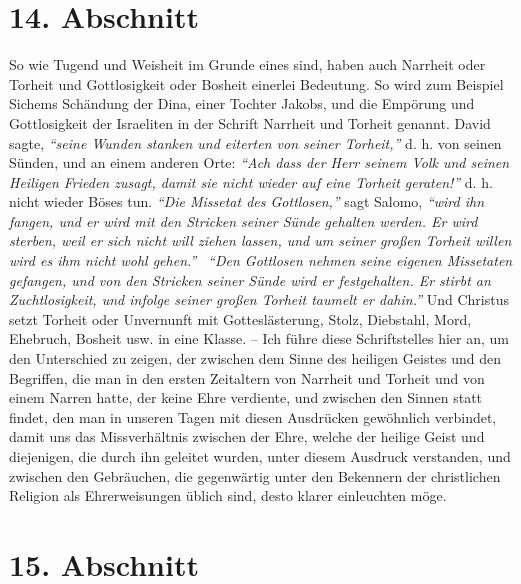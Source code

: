 \section{14. Abschnitt} \label{kap9_ab14}

So wie Tugend und Weisheit im Grunde eines sind, haben auch Narrheit oder
Torheit und Gottlosigkeit oder Bosheit einerlei Bedeutung. So wird zum Beispiel
Sichems Schändung der Dina, einer
Tochter Jakobs, und die Empörung und
Gottlosigkeit der Israeliten in der Schrift Narrheit
und Torheit
genannt.
David sagte,
\textit{"`seine Wunden stanken
und eiterten von seiner Torheit,"'}
d. h. von seinen Sünden,
und an einem anderen Orte:
\textit{"`Ach dass der Herr seinem Volk und seinen Heiligen
Frieden zusagt, damit sie nicht wieder auf eine Torheit
geraten!"'}
d. h. nicht wieder Böses tun.
\textit{"`Die Missetat des Gottlosen,"'}
sagt Salomo,
\textit{"`wird ihn fangen, und er wird mit den Stricken
seiner Sünde gehalten werden. Er wird sterben, weil er sich nicht
will ziehen lassen, und um seiner großen Torheit willen wird es ihm nicht wohl
gehen."'}~ \textit{"`Den Gottlosen nehmen seine eigenen Missetaten gefangen,
und von den Stricken seiner Sünde wird er festgehalten. Er stirbt an
Zuchtlosigkeit, und infolge seiner großen Torheit taumelt er dahin."'}
Und Christus setzt Torheit oder
Unvernunft mit Gotteslästerung, Stolz, Diebstahl, Mord, Ehebruch, Bosheit usw.
in eine Klasse. -- Ich führe diese Schriftstelles hier an, um den
Unterschied zu zeigen, der zwischen dem Sinne des heiligen Geistes und den
Begriffen, die man in den ersten Zeitaltern von Narrheit und Torheit und von
einem Narren hatte, der keine Ehre verdiente, und zwischen den Sinnen statt
findet, den man in unseren Tagen mit diesen Ausdrücken gewöhnlich verbindet,
damit uns das Missverhältnis zwischen der Ehre, welche der heilige Geist und
diejenigen, die durch ihn geleitet wurden, unter diesem Ausdruck verstanden,
und zwischen den Gebräuchen, die gegenwärtig unter den Bekennern der
christlichen Religion als Ehrerweisungen üblich sind, desto klarer einleuchten
möge.

\section{15. Abschnitt} \label{kap9_ab15}

